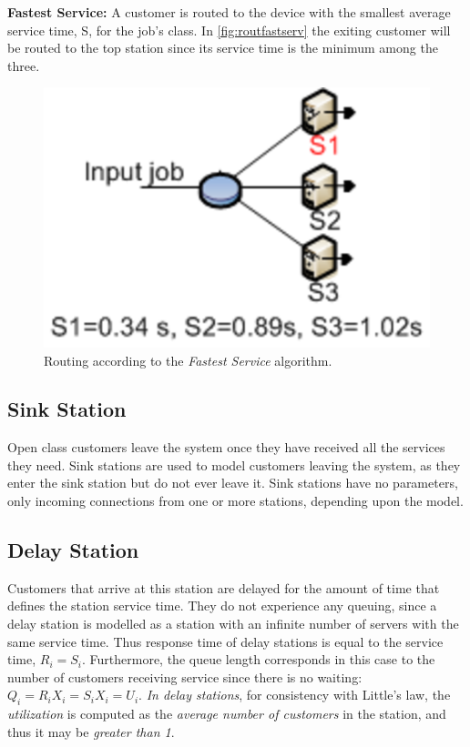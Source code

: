 \begin{itemize*}
\item \textbf{Fastest Service:} A customer is routed to the device
with the smallest average service time, S, for the job's class. In
\autoref{fig:routfastserv} the exiting customer will be routed to
the top station since its service time is the minimum among the
three.
\begin{figure}[htb]
    \begin{center}
        \includegraphics[scale=.5]{img/jsimg/8.14.eps}
    \end{center}
    \caption{Routing according to the \emph{Fastest Service}
    algorithm.}
    \label{fig:routfastserv}
\end{figure}
\end{itemize*}

\subsection{Sink Station} Open class customers leave the
system once they have received all the services they need. Sink
stations are used to model customers leaving the system, as they
enter the sink station but do not ever leave it. Sink stations
have no parameters, only incoming connections from one or more
stations, depending upon the model.

\subsection{Delay Station}
\label{dstat} Customers that arrive at this
station are delayed for the amount of time that defines the
station service time. They do not experience any queuing, since a
delay station is modelled as a station with an infinite number of
servers with the same service time. Thus response time of delay
stations is equal to the service time, $R_i = S_i$. Furthermore,
the queue length corresponds in this case to the number of
customers receiving service since there is no waiting: $Q_i = R_i
X_i = S_i X_i = U_i$. \emph{In delay stations}, for consistency
with Little's law, the \emph{utilization} is computed as the
\emph{average number of customers} in the station, and thus it may
be \emph{greater than 1}.


